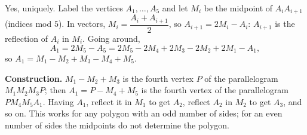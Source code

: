 Yes, uniquely. Label the vertices $A_1,\dots,A_5$ and let $M_i$ be the midpoint of $A_iA_{i+1}$ (indices mod $5$). In vectors, $M_i=\dfrac{A_i+A_{i+1}}{2}$, so $A_{i+1}=2M_i-A_i$: $A_{i+1}$ is the reflection of $A_i$ in $M_i$. Going around,
\[
A_1=2M_5-A_5=2M_5-2M_4+2M_3-2M_2+2M_1-A_1,
\]
so $A_1=M_1-M_2+M_3-M_4+M_5$.


\textbf{Construction.} $M_1-M_2+M_3$ is the fourth vertex $P$ of the parallelogram $M_1M_2M_3P$; then $A_1=P-M_4+M_5$ is the fourth vertex of the parallelogram $PM_4M_5A_1$. Having $A_1$, reflect it in $M_1$ to get $A_2$, reflect $A_2$ in $M_2$ to get $A_3$, and so on. This works for any polygon with an odd number of sides; for an even number of sides the midpoints do not determine the polygon.
